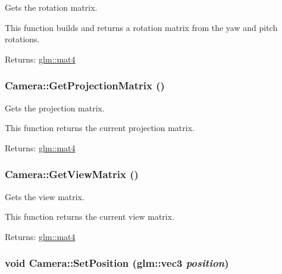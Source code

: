 Gets the rotation matrix. 

This function builds and returns a rotation matrix from the yaw and pitch rotations.

\begin{Desc}
\item[Returns:]\hyperlink{group__core__types_g7dcd2365c2e368e6af5b7adeb6a9c8df}{glm::mat4} \end{Desc}
\hypertarget{class_camera_b0a4bf5a65d45f25529e3cffda1c361b}{
\subsubsection[GetProjectionMatrix]{ Camera::GetProjectionMatrix ()}}
\label{class_camera_b0a4bf5a65d45f25529e3cffda1c361b}


Gets the projection matrix. 

This function returns the current projection matrix.

\begin{Desc}
\item[Returns:]\hyperlink{group__core__types_g7dcd2365c2e368e6af5b7adeb6a9c8df}{glm::mat4} \end{Desc}
\hypertarget{class_camera_ffa333055635aed96518c4c66be9a70c}{
\subsubsection[GetViewMatrix]{ Camera::GetViewMatrix ()}}
\label{class_camera_ffa333055635aed96518c4c66be9a70c}


Gets the view matrix. 

This function returns the current view matrix.

\begin{Desc}
\item[Returns:]\hyperlink{group__core__types_g7dcd2365c2e368e6af5b7adeb6a9c8df}{glm::mat4} \end{Desc}
\hypertarget{class_camera_513c43647fdc22a1f1f2ce75d67e6c43}{
\subsubsection[SetPosition]{\setlength{\rightskip}{0pt plus 5cm}void Camera::SetPosition ({\bf glm::vec3} {\em position})}}
\label{class_camera_513c43647fdc22a1f1f2ce75d67e6c43}


